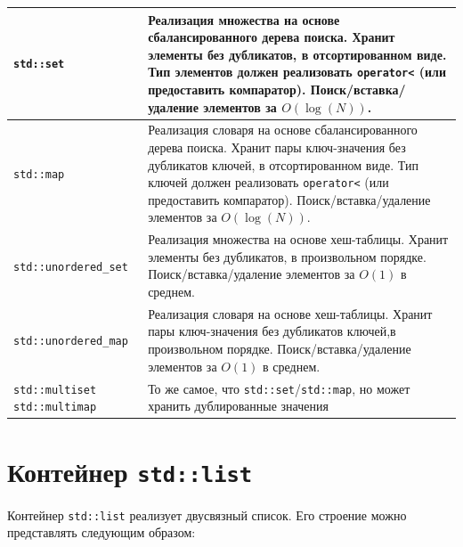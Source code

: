 \documentclass{article}
\begin{document}
\begin{center}
\begin{tabular}{ p{3.3cm} | p{14cm} }
\texttt{std::set} &
Реализация множества на основе сбалансированного дерева поиска. \newline 
Хранит элементы без дубликатов, в отсортированном виде. \newline 
Тип элементов должен реализовать \texttt{operator<} (или предоставить компаратор). \newline 
Поиск/вставка/удаление элементов за $O(\log(N))$. \newline 
\\ \hline


\texttt{std::map} &
Реализация словаря на основе сбалансированного дерева поиска. \newline 
Хранит пары ключ-значения без дубликатов ключей, в отсортированном виде. \newline 
Тип ключей должен реализовать \texttt{operator<}  (или предоставить компаратор).\newline 
Поиск/вставка/удаление элементов за $O(\log(N))$. \newline 
\\ \hline


\texttt{std::unordered\_set} &
Реализация множества на основе хеш-таблицы. \newline 
Хранит элементы без дубликатов, в произвольном порядке. \newline 
Поиск/вставка/удаление элементов за $O(1)$ в среднем. \newline 
\\ \hline


\texttt{std::unordered\_map} &
Реализация словаря на основе хеш-таблицы. \newline 
Хранит пары ключ-значения без дубликатов ключей,в произвольном порядке. \newline 
Поиск/вставка/удаление элементов за $O(1)$ в среднем. \newline 
\\ \hline

\texttt{std::multiset} \newline \texttt{std::multimap}
& То же самое, что \texttt{std::set}/\texttt{std::map}, но может хранить дублированные значения  \\
\hline
\end{tabular}
\egroup
\end{center}



\newpage
\section*{Контейнер \texttt{std::list}}
Контейнер \texttt{std::list} реализует двусвязный список.
Его строение можно представлять следующим образом: 
\end{document}
